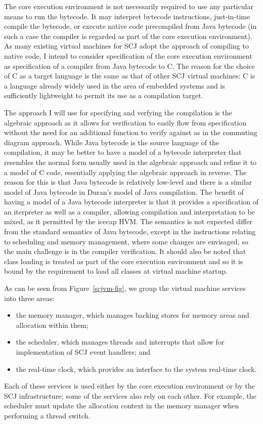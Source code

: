 \documentclass[a4paper,10pt]{report}
\begin{document}
The core execution environment is not necessarily required to use any particular
means to run the bytecode.  It may interpret bytecode instructions, just-in-time
compile the bytecode, or execute native code precompiled from Java bytecode (in
such a case the compiler is regarded as part of the core execution
environment). As many existing virtual machines for SCJ adopt the approach of
compiling to native code, I intend to consider specification of the core
execution environment as specification of a compiler from Java bytecode to
C. The reason for the choice of C as a target language is the same as that of
other SCJ virtual machines: C is a language already widely used in the area of
embedded systems and is sufficiently lightweight to permit its use as a
compilation target.

The approach I will use for specifying and verfying the compilation is the
algebraic approach as it allows for verification to easily flow from
specification without the need for an additional function to verify against as
in the commuting diagram approach. While Java bytecode is the source language of
the compilation, it may be better to have a model of a bytecode interpreter that
resembles the normal form usually used in the algebraic approach and refine it
to a model of C code, essentially applying the algebraic approach in
reverse. The reason for this is that Java bytecode is relatively low-level and
there is a similar model of Java bytecode in Duran's model of Java
compilation. The benefit of having a model of a Java bytecode interpreter is
that it provides a specification of an iterpreter as well as a compiler,
allowing compilation and interpretation to be mixed, as it permitted by the
icecap HVM. The semantics is not expected differ from the standard semantics of
Java bytecode, except in the instructions relating to scheduling and memory
management, where some changes are envisaged, so the main challenge is in the
compiler verification. It should also be noted that class loading is treated as
part of the core execution environment and so it is bound by the requirement to
load all classes at virtual machine startup.

As can be seen from Figure~\ref{scjvm-fig}, we group the virtual machine
services into three areas:
\begin{itemize}
\item the memory manager, which manages backing stores for memory areas and
  allocation within them;
\item the scheduler, which manages threads and interrupts that allow for
  implementation of SCJ event handlers; and
\item the real-time clock, which provides an interface to the system real-time
  clock.
\end{itemize}
Each of these services is used either by the core execution environment or by
the SCJ infrastructure; some of the services also rely on each other.  For
example, the scheduler must update the allocation context in the memory manager
when performing a thread switch.
\end{document}
